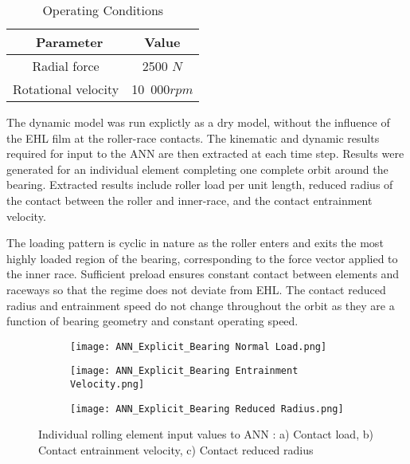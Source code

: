 \begin{table*}
	\caption{Operating Conditions}
	\label{Operating Conditions}
	\centering
	\renewcommand{\arraystretch}{1.5}%
	\begin{tabular}{|c|c|}
		\hline
		\ \textbf{Parameter} & \textbf{Value} \\ [0.5ex]
		\hline
		Radial force & 2500 $N$ \\ [0.5ex]
		\hline
		Rotational velocity & 10~000$rpm$ \\ [0.5ex]
		\hline
	\end{tabular}
\end{table*}

The dynamic model was run explictly as a dry model, without the influence of the EHL film at the roller-race contacts. The kinematic and dynamic results required for input to the ANN are then extracted at each time step. Results were generated for an individual element completing one complete orbit around the bearing. Extracted results include roller load per unit length, reduced radius of the contact between the roller and inner-race, and the contact entrainment velocity.

The loading pattern is cyclic in nature as the roller enters and exits the most highly loaded region of the bearing, corresponding to the force vector applied to the inner race. Sufficient preload ensures constant contact between elements and raceways so that the regime does not deviate from EHL. The contact reduced radius and entrainment speed do not change throughout the orbit as they are a function of bearing geometry and constant operating speed.

\begin{figure}
	\centering
	\begin{subfigure}[b]{0.9\textwidth}
		\centering
		\texttt{[image: ANN\_Explicit\_Bearing Normal Load.png]}
		\caption{}
		\label{Contact Normal Load ANN}
	\end{subfigure}
	\hfill
	\begin{subfigure}[b]{0.9\textwidth}
		\centering
		\texttt{[image: ANN\_Explicit\_Bearing Entrainment Velocity.png]}
		\caption{}
		\label{Contact Entrainment ANN}
	\end{subfigure}
	\hfill
	\begin{subfigure}[b]{0.9\textwidth}
		\centering
		\texttt{[image: ANN\_Explicit\_Bearing Reduced Radius.png]}
		\caption{}
		\label{Contact Reduced Radius ANN}
	\end{subfigure}
	\caption{Individual rolling element input values to ANN : a) Contact load, b) Contact entrainment velocity, c) Contact reduced radius}
	\label{Individual rolling element input values to ANN}
\end{figure}








